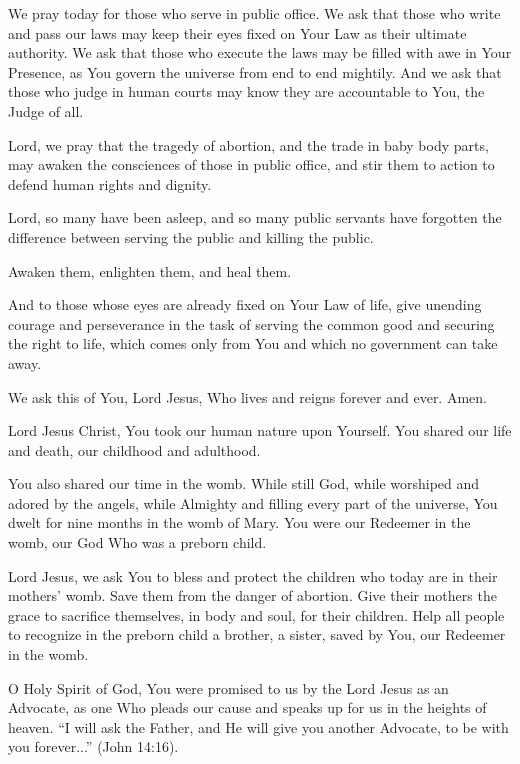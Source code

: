 We pray today for those who serve in public office.
We ask that those who write and pass our laws may keep their eyes fixed on Your Law as their ultimate authority.
We ask that those who execute the laws may be filled with awe in Your Presence, as You govern the universe from end to end mightily.
And we ask that those who judge in human courts may know they are accountable to You, the Judge of all.

Lord, we pray that the tragedy of abortion, and the trade in baby body parts, may awaken the consciences of those in public office, and stir them to action to defend human rights and dignity.

Lord, so many have been asleep, and so many public servants have forgotten the difference between serving the public and killing the public.

Awaken them, enlighten them, and heal them.

And to those whose eyes are already fixed on Your Law of life, give unending courage and perseverance in the task of serving the common good and securing the right to life, which comes only from You and which no government can take away.

We ask this of You, Lord Jesus, Who lives and reigns forever and ever. Amen.

Lord Jesus Christ, You took our human nature upon Yourself.
You shared our life and death, our childhood and adulthood.

You also shared our time in the womb. While still God, while worshiped and adored by the angels, while Almighty and filling every part of the universe, You dwelt for nine months in the womb of Mary.
You were our Redeemer in the womb, our God Who was a preborn child.

Lord Jesus, we ask You to bless and protect the children who today are in their mothers' womb.
Save them from the danger of abortion.
Give their mothers the grace to sacrifice themselves, in body and soul, for their children.
Help all people to recognize in the preborn child a brother, a sister, saved by You, our Redeemer in the womb.

O Holy Spirit of God, You were promised to us by the Lord Jesus as an Advocate, as one Who pleads our cause and speaks up for us in the heights of heaven.
``I will ask the Father, and He will give you another Advocate, to be with you forever...'' (John 14:16).

